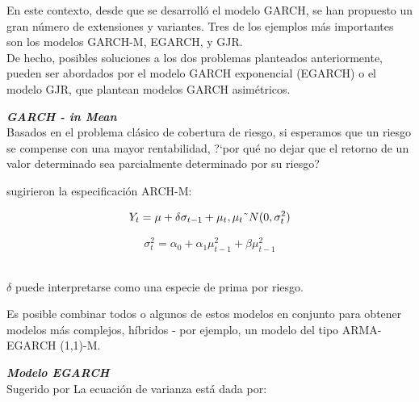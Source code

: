 		\vspace{2mm}	
		
		En este contexto, desde que se desarroll\'o el modelo GARCH, se han propuesto un gran n\'umero de extensiones y variantes. Tres de los ejemplos m\'as importantes son los modelos GARCH-M, EGARCH, y GJR. \\
		De hecho, posibles soluciones a los dos problemas planteados anteriormente, pueden ser abordados por el modelo GARCH exponencial (EGARCH) o el modelo GJR, que plantean modelos GARCH asim\'etricos. 
		\vspace{2mm}	
	
\textit{\textbf{GARCH - in Mean}}\\
		Basados en el problema cl\'asico de cobertura de riesgo, si esperamos que un riesgo se compense con una mayor rentabilidad, ?`por qu\'e no dejar que el retorno de un valor determinado sea parcialmente determinado por su riesgo?
		\vspace{2mm}	
		
		\cite{engle1987estimating} sugirieron la especificaci\'on ARCH-M:
		
		\begin{equation}
		Y_t = \mu + \delta \sigma_{t-1} + \mu_t , \mu_t \string~N(0,\sigma^2_t)
		\end{equation}
		
		\begin{equation}
		\sigma^2_t = \alpha_0 + \alpha_1 \mu^2_{t-1} + \beta \mu^2_{t-1}
		\end{equation} 
		
		$\delta$ puede interpretarse como una especie de prima por riesgo.
		
		Es posible combinar todos o algunos de estos modelos en conjunto para obtener modelos m\'as complejos, h\'{i}bridos - por ejemplo, un modelo del tipo ARMA-EGARCH (1,1)-M.
		\vspace{2mm}	
		
	
\textit{\textbf{Modelo EGARCH}}\\
		Sugerido por \cite{nelson1991conditional} La ecuaci\'on de varianza est\'a dada por: 
		

